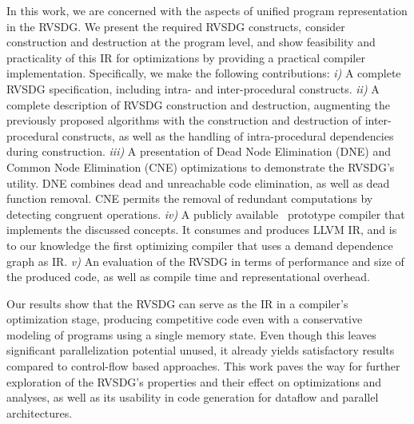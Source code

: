In this work, we are concerned with the aspects of unified program
representation in the RVSDG. We present the required RVSDG constructs, consider
construction and destruction at the program level, and show feasibility and
practicality of this IR for optimizations by providing a practical compiler implementation.
Specifically, we make the following contributions: \emph{i)} A complete RVSDG specification,
including intra- and inter-procedural constructs. \emph{ii)} A complete description of RVSDG
construction and destruction, augmenting the previously proposed algorithms with the construction
and destruction of inter-procedural constructs, as well as the handling of intra-procedural
dependencies during construction. \emph{iii)} A presentation of Dead Node Elimination (DNE) and
Common Node Elimination (CNE) optimizations to demonstrate the RVSDG's utility. DNE combines dead
and unreachable code elimination, as well as dead function removal. CNE permits the removal of
redundant computations by detecting congruent operations. \emph{iv)} A publicly
available~\cite{jlm} prototype compiler that implements the discussed concepts.  It consumes and
produces LLVM IR, and is to our knowledge the first optimizing compiler that uses a demand
dependence graph as IR. \emph{v)} An evaluation of the RVSDG in terms of performance and size of
the produced code, as well as compile time and representational overhead.








Our results show that the RVSDG can serve as the IR in a compiler's optimization stage, producing
competitive code even with a conservative modeling of programs using a single memory state.
Even though this leaves significant parallelization potential
unused, it already yields satisfactory results compared to control-flow
based approaches.
This work paves the way for %
further exploration of the RVSDG's properties and their effect on optimizations
and analyses, as well as its usability in code generation for dataflow and
parallel architectures.





